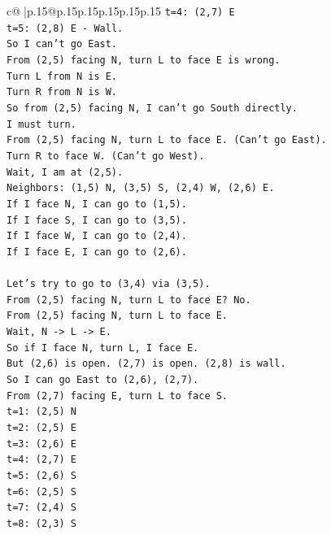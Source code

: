 \documentclass{article}
\begin{document}
{\begin{supertabular}{c@{$\;$}|p{.15\linewidth}@{}p{.15\linewidth}p{.15\linewidth}p{.15\linewidth}p{.15\linewidth}p{.15\linewidth}}
{{{\texttt{t=4: (2,7) E} \\
\texttt{t=5: (2,8) E {-} Wall.} \\
\texttt{So I can't go East.} \\
\texttt{From (2,5) facing N, turn L to face E is wrong.} \\
\texttt{Turn L from N is E.} \\
\texttt{Turn R from N is W.} \\
\texttt{So from (2,5) facing N, I can't go South directly.} \\
\texttt{I must turn.} \\
\texttt{From (2,5) facing N, turn L to face E. (Can't go East).} \\
\texttt{Turn R to face W. (Can't go West).} \\
\texttt{Wait, I am at (2,5).} \\
\texttt{Neighbors: (1,5) N, (3,5) S, (2,4) W, (2,6) E.} \\
\texttt{If I face N, I can go to (1,5).} \\
\texttt{If I face S, I can go to (3,5).} \\
\texttt{If I face W, I can go to (2,4).} \\
\texttt{If I face E, I can go to (2,6).} \\
\\ 
\texttt{Let's try to go to (3,4) via (3,5).} \\
\texttt{From (2,5) facing N, turn L to face E? No.} \\
\texttt{From (2,5) facing N, turn L to face E.} \\
\texttt{Wait, N {-}> L {-}> E.} \\
\texttt{So if I face N, turn L, I face E.} \\
\texttt{But (2,6) is open. (2,7) is open. (2,8) is wall.} \\
\texttt{So I can go East to (2,6), (2,7).} \\
\texttt{From (2,7) facing E, turn L to face S.} \\
\texttt{t=1: (2,5) N} \\
\texttt{t=2: (2,5) E} \\
\texttt{t=3: (2,6) E} \\
\texttt{t=4: (2,7) E} \\
\texttt{t=5: (2,6) S} \\
\texttt{t=6: (2,5) S} \\
\texttt{t=7: (2,4) S} \\
\texttt{t=8: (2,3) S} \\
}}}
\end{supertabular}}
\end{document}
